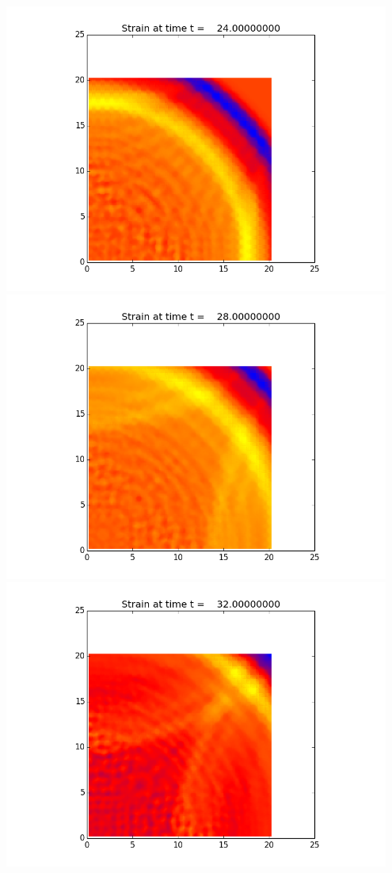 \documentclass[11pt]{article}
\begin{document}
\vskip 10pt 
\includegraphics[width=0.95\textwidth]{frame0006fig0.png}
\vskip 10pt 
\includegraphics[width=0.95\textwidth]{frame0007fig0.png}
\vskip 10pt 
\includegraphics[width=0.95\textwidth]{frame0008fig0.png}
\end{document}
